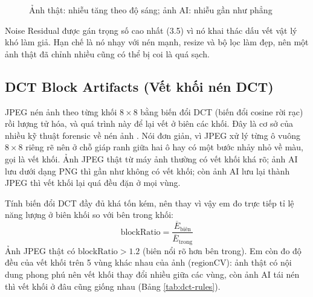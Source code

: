 \begin{figure}[H]
\centering
{}
\caption{Ảnh thật: nhiễu tăng theo độ sáng; ảnh AI: nhiễu gần như phẳng}
\label{fig:noise-shot}
\end{figure}

Noise Residual được gán trọng số cao nhất (3.5) vì nó khai thác dấu vết vật lý khó làm giả. Hạn chế là nó nhạy với nén mạnh, resize và bộ lọc làm đẹp, nên một ảnh thật đã chỉnh nhiều cũng có thể bị coi là quá sạch.

\subsection{DCT Block Artifacts (Vết khối nén DCT)}
JPEG nén ảnh theo từng khối $8\times8$ bằng biến đổi DCT (biến đổi cosine rời rạc) rồi lượng tử hóa, và quá trình này để lại vết ở biên các khối. Đây là cơ sở của nhiều kỹ thuật forensic về nén ảnh \cite{popescu,fridrich2009}. Nói đơn giản, vì JPEG xử lý từng ô vuông $8\times8$ riêng rẽ nên ở chỗ giáp ranh giữa hai ô hay có một bước nhảy nhỏ về màu, gọi là vết khối. Ảnh JPEG thật từ máy ảnh thường có vết khối khá rõ; ảnh AI lưu dưới dạng PNG thì gần như không có vết khối; còn ảnh AI lưu lại thành JPEG thì vết khối lại quá đều đặn ở mọi vùng.

Tính biến đổi DCT đầy đủ khá tốn kém, nên thay vì vậy em đo trực tiếp tỉ lệ năng lượng ở biên khối so với bên trong khối:
\[
\text{blockRatio}=\frac{\overline{E}_{\text{biên}}}{\overline{E}_{\text{trong}}}
\]
Ảnh JPEG thật có $\text{blockRatio}>1.2$ (biên nổi rõ hơn bên trong). Em còn đo độ đều của vết khối trên 5 vùng khác nhau của ảnh ($\text{regionCV}$): ảnh thật có nội dung phong phú nên vết khối thay đổi nhiều giữa các vùng, còn ảnh AI tái nén thì vết khối ở đâu cũng giống nhau (Bảng \ref{tab:dct-rules}).

